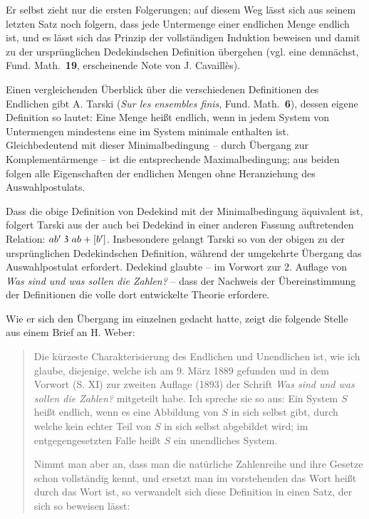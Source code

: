 \documentclass[leqno,hidelinks,10pt]{article}
\theoremstyle{definition}
\newcommand\TeilVon{\mathrel{\raisebox{0.45ex}{$\mathfrak{3}$}}}
\begin{document}
\begin{paracol}{2}
\begin{leftcolumn}
Er selbst zieht nur die ersten Folgerungen; auf diesem Weg lässt sich aus seinem
letzten Satz noch folgern, dass jede Untermenge einer endlichen Menge endlich ist,
und es lässt sich das Prinzip der vollständigen Induktion beweisen und damit zu
der ursprünglichen Dedekindschen Definition übergehen (vgl. eine demnächst, Fund.
Math.\ \textbf{19}, erscheinende Note von J. Cavaillès).

Einen vergleichenden Überblick über die verschiedenen Definitionen des Endlichen
gibt A. Tarski (\emph{Sur les ensembles finis}, Fund. Math.\ \textbf{6}), dessen
eigene Definition so lautet: Eine Menge heißt endlich, wenn in jedem System von
Untermengen mindestens eine im System minimale enthalten ist. Gleichbedeutend mit
dieser Minimalbedingung -- durch Übergang zur Komplementärmenge -- ist die
entsprechende Maximalbedingung; aus beiden folgen alle Eigenschaften der endlichen
Mengen ohne Heranziehung des Auswahlpostulats.

Dass die obige Definition von Dedekind mit der Minimalbedingung äquivalent ist,
folgert Tarski aus der auch bei Dedekind in einer anderen Fassung auftretenden
Relation: $ab' \TeilVon ab + [b']$. Insbesondere gelangt Tarski so von der obigen
zu der ursprünglichen Dedekindschen Definition, während der umgekehrte Übergang
das Auswahlpostulat erfordert. Dedekind glaubte -- im Vorwort zur 2. Auflage von
\textit{\glqq Was sind und was sollen die Zahlen?\grqq{}} -- dass der Nachweis
der Übereinstimmung der Definitionen die volle dort entwickelte Theorie erfordere.

Wie er sich den Übergang im einzelnen gedacht hatte, zeigt die folgende Stelle
aus einem Brief an H. Weber:
\begin{quote}
\glqq Die kürzeste Charakterisierung des Endlichen und Unendlichen ist, wie ich
glaube, diejenige, welche ich am 9. März 1889 gefunden und in dem Vorwort (S. XI)
zur zweiten Auflage (1893) der Schrift \textit{\glqq Was sind und was sollen die
Zahlen?\grqq{}} mitgeteilt habe. Ich spreche sie so aus: \glq Ein System $S$ heißt
endlich, wenn es eine Abbildung von $S$ in sich selbst gibt, durch welche kein
echter Teil von $S$ in sich selbst abgebildet wird; im entgegengesetzten Falle
heißt $S$ ein unendliches System\grq{}.

\hspace{12pt} Nimmt man aber an, dass man die natürliche Zahlenreihe und ihre
Gesetze schon vollständig kennt, und
ersetzt man im vorstehenden das Wort \glq heißt\grq{} durch das Wort \glq ist\grq{},
so verwandelt sich diese Definition in einen Satz, der sich so beweisen lässt:


\end{quote}
\end{leftcolumn}
\end{paracol}
\end{document}
